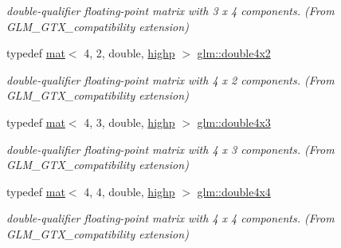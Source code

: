 \begin{DoxyCompactItemize}
\begin{DoxyCompactList}\small\item\em double-\/qualifier floating-\/point matrix with 3 x 4 components. (From G\+L\+M\+\_\+\+G\+T\+X\+\_\+compatibility extension) \end{DoxyCompactList}\item 
typedef \hyperlink{structglm_1_1mat}{mat}$<$ 4, 2, double, \hyperlink{namespaceglm_a36ed105b07c7746804d7fdc7cc90ff25ac6f7eab42eacbb10d59a58e95e362074}{highp} $>$ \hyperlink{group__gtx__compatibility_ga5ca0eb6627cf8829e3cab6694d1a6452}{glm\+::double4x2}
\begin{DoxyCompactList}\small\item\em double-\/qualifier floating-\/point matrix with 4 x 2 components. (From G\+L\+M\+\_\+\+G\+T\+X\+\_\+compatibility extension) \end{DoxyCompactList}\item 
typedef \hyperlink{structglm_1_1mat}{mat}$<$ 4, 3, double, \hyperlink{namespaceglm_a36ed105b07c7746804d7fdc7cc90ff25ac6f7eab42eacbb10d59a58e95e362074}{highp} $>$ \hyperlink{group__gtx__compatibility_ga2f73c8a3c9cd5198695163229f0ce754}{glm\+::double4x3}
\begin{DoxyCompactList}\small\item\em double-\/qualifier floating-\/point matrix with 4 x 3 components. (From G\+L\+M\+\_\+\+G\+T\+X\+\_\+compatibility extension) \end{DoxyCompactList}\item 
typedef \hyperlink{structglm_1_1mat}{mat}$<$ 4, 4, double, \hyperlink{namespaceglm_a36ed105b07c7746804d7fdc7cc90ff25ac6f7eab42eacbb10d59a58e95e362074}{highp} $>$ \hyperlink{group__gtx__compatibility_gaa0d75f4adb5cb1af3b1ba09720954306}{glm\+::double4x4}
\begin{DoxyCompactList}\small\item\em double-\/qualifier floating-\/point matrix with 4 x 4 components. (From G\+L\+M\+\_\+\+G\+T\+X\+\_\+compatibility extension) \end{DoxyCompactList}\end{DoxyCompactItemize}
